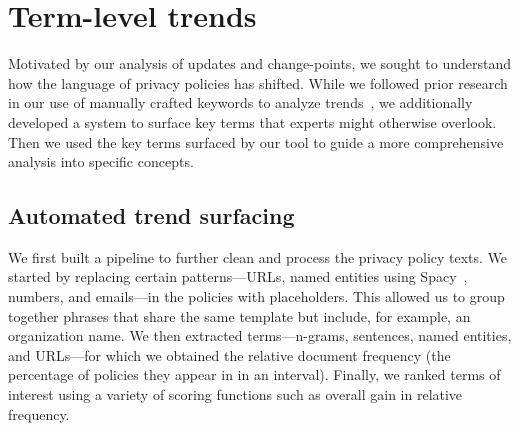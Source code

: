 \section{Term-level trends}
\label{sec:analysis}

Motivated by our analysis of updates and change-points, we sought to understand how the language of privacy policies has shifted. While we followed prior research in our use of manually crafted keywords to analyze trends~\cite{degeling2018we},
we additionally developed a system to surface key terms that experts might otherwise overlook. Then we used the key terms surfaced by our tool to guide a more comprehensive analysis into specific concepts.

\subsection{Automated trend surfacing}
\label{sec:automated-trends}

We first built a pipeline to further clean and process the privacy policy texts. We started by replacing certain patterns---URLs, named entities using Spacy~\cite{spacy}, numbers, and emails---in the policies with placeholders. This allowed us to group together phrases that share the same template but include, for example, an organization name. We then extracted terms---n-grams, sentences, named entities, and URLs---for which we obtained the relative document frequency (the percentage of policies they appear in in an interval). Finally, we ranked terms of interest using a variety of scoring functions such as overall gain in relative frequency. 


